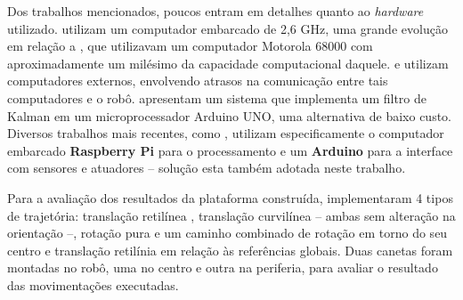 Dos trabalhos mencionados, poucos entram em detalhes quanto ao \emph{hardware} utilizado. \cite{oubbati2005velocity} utilizam um computador embarcado de 2,6 GHz, uma grande evolução em relação a \cite{feng1989servo}, que utilizavam um computador Motorola 68000 com aproximadamente um milésimo da capacidade computacional daquele. \cite{takemura2007development} e \cite{loh2003mechatronics} utilizam computadores externos, envolvendo atrasos na comunicação entre tais computadores e o robô. \cite{lowcostIMU} apresentam um sistema que implementa um filtro de Kalman em um microprocessador Arduino UNO, uma alternativa de baixo custo. Diversos trabalhos mais recentes, como \cite{krinkin2015design}, utilizam especificamente o computador embarcado \textbf{Raspberry Pi} para o processamento e um \textbf{Arduino} para a interface com sensores e atuadores -- solução esta também adotada neste trabalho.

Para a avaliação dos resultados da plataforma construída, \cite{loh2003mechatronics} implementaram 4 tipos de trajetória: translação retilínea , translação curvilínea -- ambas sem alteração na orientação --, rotação pura e um caminho combinado de rotação em torno do seu centro e translação retilínia em relação às referências globais. Duas canetas foram montadas no robô, uma no centro e outra na periferia, para avaliar o resultado das movimentações executadas.
